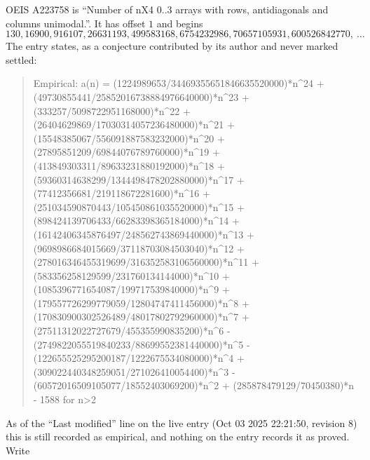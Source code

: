 \documentclass[11pt,a4paper]{article}
\theoremstyle{plain}
\theoremstyle{definition}
\begin{document}
OEIS A223758 is ``Number of nX4 0..3 arrays with rows, antidiagonals and columns unimodal.''. It has offset $1$ and begins
\[
130, 16900, 916107, 26631193, 499583168, 6754232986, 70657105931, 600526842770,\ \dots
\]
The entry states, as a conjecture contributed by its author and never marked settled:
\begin{quote}\raggedright\small
Empirical: a(n) = (1224989653/34469355651846635520000)*n\^{}24 + (49730855441/25852016738884976640000)*n\^{}23 + (333257/5098722951168000)*n\^{}22 + (26404629869/17030314057236480000)*n\^{}21 + (15548385067/556091887583232000)*n\^{}20 + (27895851209/69844076789760000)*n\^{}19 + (413849303311/89633231880192000)*n\^{}18 + (59360314638299/1344498478202880000)*n\^{}17 + (77412356681/219118672281600)*n\^{}16 + (251034590870443/105450861035520000)*n\^{}15 + (898424139706433/66283398365184000)*n\^{}14 + (16142406345876497/248562743869440000)*n\^{}13 + (9698986684015669/37118703084503040)*n\^{}12 + (278016346455319699/316352583106560000)*n\^{}11 + (583356258129599/231760134144000)*n\^{}10 + (1085396771654087/199717539840000)*n\^{}9 + (179557726299779059/12804747411456000)*n\^{}8 + (170830900302526489/48017802792960000)*n\^{}7 + (27511312022727679/455355990835200)*n\^{}6 - (2749822055519840233/88699552381440000)*n\^{}5 - (122655525295200187/1222675534080000)*n\^{}4 + (309022440348259051/271026410054400)*n\^{}3 - (60572016509105077/18552403069200)*n\^{}2 + (285878479129/70450380)*n - 1588 for n>2
\end{quote}
As of the ``Last modified'' line on the live entry (Oct 03 2025 22:21:50, revision 8) this is still
recorded as empirical, and nothing on the entry records it as proved. Write
\end{document}
